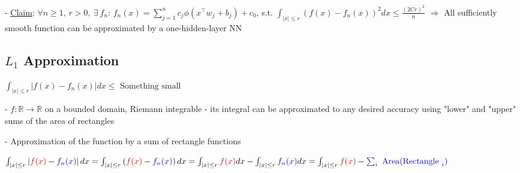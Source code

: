 - \underline{Claim}: $\forall n \geq 1$, $r>0, \ \exists \ f_{n}$:
$
f_{n}(x)=\sum_{j=1}^{n} c_{j} \phi\left(x^{\top} w_{j}+b_{j}\right)+c_{0}
$,
s.t. 
$
\int_{|x| \leq r}\left(f(x)-f_{n}(x)\right)^{2} d x \leq \frac{(2 C r)^{2}}{n}
$
$\Rightarrow$ All sufficiently smooth function can be approximated by a one-hidden-layer NN


\subsection*{$L_{1}$ Approximation}



$
\int_{|x| \leq r}\left|f(x)-f_{n}(x)\right| d x \leq \text { Something small }
$


- $f: \mathbb{R} \rightarrow \mathbb{R}$ on a bounded domain, Riemann integrable - its integral can be approximated to any desired accuracy using "lower" and "upper" sums of the area of rectangles

- Approximation of the function by a sum of rectangle functions

$
\int_{|x| \leq r}\left|\color{red}{f(x)}\color{black}-\color{blue}{f_{n}(x)}\color{black}\right| d x 
=\int_{|x| \leq r}\left(\color{red}f(x)\color{black}-\color{blue}f_{n}(x)\color{black}\right) d x 
=\int_{|x| \leq r} \color{red}f(x)\color{black} d x-\int_{|x| \leq r} \color{blue}f_{n}(x) \color{black} d x 
=\int_{|x| \leq r} \color{red}f(x) \color{black}-\color{blue}\sum_{i} \text { Area(Rectangle }_{i})
$


